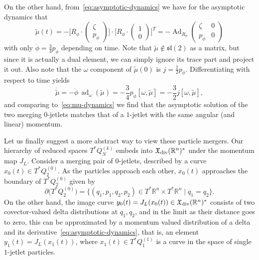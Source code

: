 \documentclass[12pt]{amsart}
\newcommand{\R}{\ensuremath{\mathbb{R}}}
\DeclareMathOperator{\Ad}{Ad}
\DeclareMathOperator{\ad}{ad}
\begin{document}
On the other hand, from~\eqref{eq:asymptotic-dynamics} we have for the
asymptotic dynamics that
\begin{equation*}
  \tilde{\mu}(t)
  = -\Big[R_\phi \cdot \begin{pmatrix} \zeta \\ p_\phi \end{pmatrix}\Big] \cdot
     \Big[R_\phi \cdot \begin{pmatrix} 1   \\ 0         \end{pmatrix}\Big]^T
  = -\Ad_{R_\phi} \begin{pmatrix} \zeta & 0 \\ p_\phi & 0 \end{pmatrix}
\end{equation*}
with only $\dot{\phi} = \frac{3}{4} p_\phi$ depending on time.
Note that $\tilde{\mu} \not\in \mathfrak{sl}(2)$ as a matrix, but
since it is actually a dual element, we can simply ignore its trace
part and project it out. Also note that the $\omega$ component of
$\tilde{\mu}(0)$ is $j = \frac{1}{2}p_\phi$. Differentiating with respect to 
time yields
\begin{equation*}
  \dot{\tilde{\mu}}
  = -\dot{\phi}\,\ad_\omega(\tilde{\mu})
  = -\frac{3}{4} p_\phi [\omega,\tilde{\mu}]
  = -\frac{3}{2} j [\omega,\tilde{\mu}], 
\end{equation*}
and comparing to~\eqref{eq:mu-dynamics} we find that the asymptotic
solution of the two merging $0$-jetlets matches that of a $1$-jetlet
with the same angular (and linear) momentum.

Let us finally suggest a more abstract way to view these particle
mergers. Our hierarchy of reduced spaces $T^*Q_N^{(k)}$ embeds into
$\mathfrak{X}_{\rm div}(\R^n)^*$ under the momentum map $J_L$.
Consider a merging pair of $0$-jetlets, described by a curve
$x_0(t) \in T^*Q_2^{(0)}$. As the particles approach each other,
$x_0(t)$ approaches the boundary of $T^*Q_2^{(0)}$ given by
\begin{equation*}\label{eq:boundary}
  \partial\big( T^*Q_2^{(0)} \big)
  = \{ (q_1,p_1,q_2,p_2) \in T^* \R^n \times T^* \R^n \mid q_1 = q_2 \}.
\end{equation*}
On the other hand, the image curve
$y_0(t) = J_L(x_0(t)) \in \mathfrak{X}_{\rm div}(\R^n)^*$ consists of
two covector-valued delta distributions at $q_1,q_2$, and in the limit
as their distance goes to zero, this can be approximated by a momentum
valued distribution of a delta and its
derivative~\eqref{eq:asymptotic-dynamics}, that is, an element
$y_1(t) = J_L(x_1(t))$, where $x_1(t) \in T^*Q_1^{(1)}$ is a curve in
the space of single $1$-jetlet particles.
\end{document}
